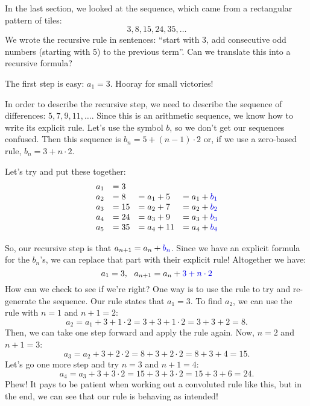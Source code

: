 In the last section, we looked at the sequence, which came from a rectangular pattern of tiles: \[3, 8, 15, 24, 35, \dotsc\]
We wrote the recursive rule in sentences: ``start with 3, add consecutive odd numbers (starting with 5) to the previous term''. Can we translate this into a recursive formula?

The first step is easy: $a_1 = 3$. Hooray for small victories!

In order to describe the recursive step, we need to describe the sequence of differences: $5, 7, 9, 11, \dotsc$. Since this is an arithmetic sequence, we know how to write its explicit rule. Let's use the symbol $b$, so we don't get our sequences confused. Then this sequence is {\color{blue!90!black}$b_n = 5 + (n-1)\cdot 2$} or, if we use a zero-based rule, {\color{blue!90!black}$b_n = 3 + n\cdot 2$}.

Let's try and put these together:
\[\begin{array}{l@{\quad}l@{\quad}l@{\quad}l}
a_1 &= 3\\
a_2 &= 8	&=  a_1 + 5		&= a_1 + {\color{blue!90!black}b_1}\\
a_3 &= 15	&= a_2 + 7		&= a_2 + {\color{blue!90!black}b_2}\\
a_4 &= 24	&= a_3 + 9		&= a_3 + {\color{blue!90!black}b_3}\\
a_5 &= 35	&= a_4 + 11	&= a_4 + {\color{blue!90!black}b_4}
\end{array}\]

So, our recursive step is that $a_{n+1} = a_n + {\color{blue!90!black}b_n}$. Since we have an explicit formula for the $b_n$'s, we can replace that part with their explicit rule! Altogether we have:
\[a_1 = 3, ~~ a_{n+1} = a_n + {\color{blue!90!black}3 + n\cdot 2}\]
How can we check to see if we're right? One way is to use the rule to try and re-generate the sequence. Our rule states that $a_1 = 3$. To find $a_2$, we can use the rule with $n=1$ and $n+1 = 2$:
\[a_2 = a_1 + 3 + 1 \cdot 2 = 3 + 3 + 1 \cdot 2 = 3 + 3 + 2 = 8.\]
Then, we can take one step forward and apply the rule again. Now, $n=2$ and $n+1 = 3$:
\[a_3 = a_2 + 3 + 2 \cdot 2 = 8 + 3 + 2 \cdot 2 = 8 + 3 + 4 = 15.\]
Let's go one more step and try $n=3$ and $n+1=4$:
\[a_4 = a_3 + 3 + 3 \cdot 2 = 15 + 3 + 3 \cdot 2 = 15 + 3 + 6 = 24.\]
Phew! It pays to be patient when working out a convoluted rule like this, but in the end, we can see that our rule is behaving as intended!

